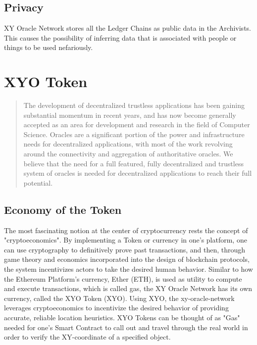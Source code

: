 \documentclass{article}
\begin{document}
\subsection {Privacy}
XY Oracle Network stores all the Ledger Chains as public data in the Archivists. This causes the possibility of inferring data that is associated with people or things to be used nefariously.

\section {XYO Token}
\begin{abstract}
The development of decentralized trustless applications has been gaining substantial momentum in recent years, and has now become generally accepted as an area for development and research in the field of Computer Science.  Oracles are a significant portion of the power and infrastructure needs for decentralized applications, with most of the work revolving around the connectivity and aggregation of authoritative oracles.  We believe that the need for a full featured, fully decentralized and trustless system of oracles is needed for decentralized applications to reach their full potential.
\end{abstract}

\subsection {Economy of the Token}
The most fascinating notion at the center of cryptocurrency rests the concept of "\gls{cryptoeconomics}". By implementing a Token or currency in one's platform, one can use cryptography to definitively prove past transactions, and then, through game theory and economics incorporated into the design of blockchain protocols, the system incentivizes actors to take the desired human behavior.
Similar to how the Ethereum Platform's currency, Ether (ETH), is used as utility to compute and execute transactions, which is called \gls{gas}, the XY Oracle Network has its own currency, called the XYO Token (XYO). Using XYO, the \gls{xy-oracle-network} leverages \gls{cryptoeconomics} to incentivize the desired behavior of providing accurate, reliable location heuristics. XYO Tokens can be thought of as "Gas" needed for one's Smart Contract to call out and travel through the real world in order to verify the XY-coordinate of a specified object. 
\end{document}
